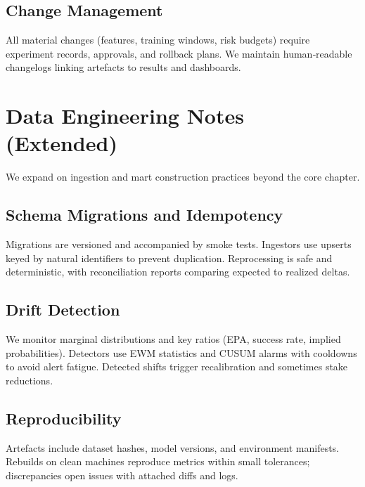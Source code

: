 \documentclass[12pt]{report}  %
\numberwithin{equation}{section}
\theoremstyle{plain}
\theoremstyle{definition}
\theoremstyle{remark}
\providecommand{\backmatter}{\cleardoublepage}
\begin{document}
\section{Change Management}
All material changes (features, training windows, risk budgets) require experiment records, approvals, and rollback plans. We maintain human‑readable changelogs linking artefacts to results and dashboards.

\chapter{Data Engineering Notes (Extended)}
We expand on ingestion and mart construction practices beyond the core chapter.

\section{Schema Migrations and Idempotency}
Migrations are versioned and accompanied by smoke tests. Ingestors use upserts keyed by natural identifiers to prevent duplication. Reprocessing is safe and deterministic, with reconciliation reports comparing expected to realized deltas.

\section{Drift Detection}
We monitor marginal distributions and key ratios (EPA, success rate, implied probabilities). Detectors use EWM statistics and CUSUM alarms with cooldowns to avoid alert fatigue. Detected shifts trigger recalibration and sometimes stake reductions.

\section{Reproducibility}
Artefacts include dataset hashes, model versions, and environment manifests. Rebuilds on clean machines reproduce metrics within small tolerances; discrepancies open issues with attached diffs and logs.
%

\backmatter
\cleardoublepage
{}
{}  %

\end{document}
